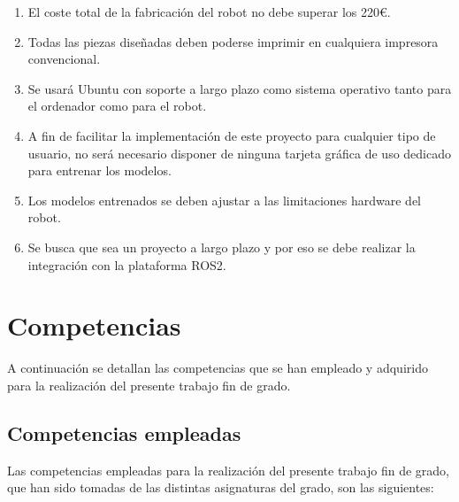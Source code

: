 \begin{enumerate}
	\item{} El coste total de la fabricación del robot no debe superar los 220€.
	\item{} Todas las piezas diseñadas deben poderse imprimir en cualquiera impresora convencional.
	\item{} Se usará Ubuntu con soporte a largo plazo como sistema operativo tanto para el ordenador como para el robot.
	\item{} A fin de facilitar la implementación de este proyecto para cualquier tipo de usuario, no será necesario disponer de ninguna tarjeta gráfica de uso dedicado para entrenar los modelos. 
	\item{} Los modelos entrenados se deben ajustar a las limitaciones hardware del robot.
	\item{} Se busca que sea un proyecto a largo plazo y por eso se debe realizar la integración con la plataforma ROS2. 
	
	
\end{enumerate}

\section{Competencias}

A continuación se detallan las competencias que se han empleado y adquirido para la realización del presente trabajo fin de grado.
   
\subsection{Competencias empleadas}
Las competencias empleadas para la realización del presente trabajo fin de grado, que han sido tomadas de las distintas asignaturas del grado, son las siguientes: 

